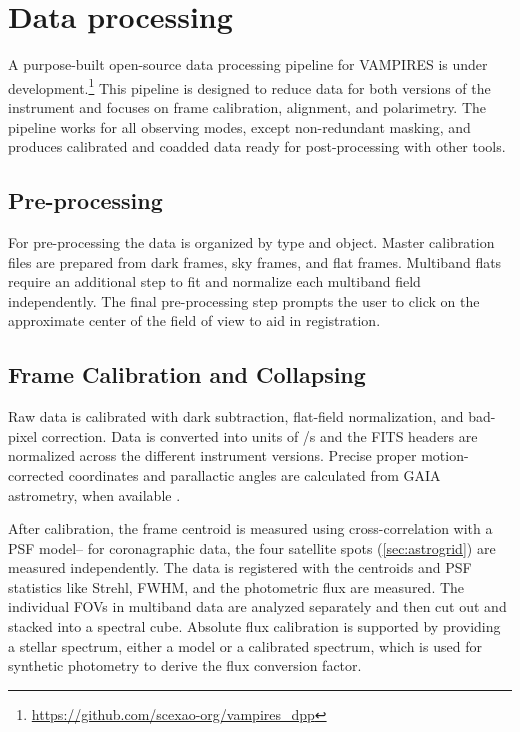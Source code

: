 \section{Data processing}\label{sec:processing}

A purpose-built open-source data processing pipeline for VAMPIRES is under development.\footnote{\url{https://github.com/scexao-org/vampires_dpp}} This pipeline is designed to reduce data for both versions of the instrument and focuses on frame calibration, alignment, and polarimetry. The pipeline works for all observing modes, except non-redundant masking, and produces calibrated and coadded data ready for post-processing with other tools.

\subsection{Pre-processing}
For pre-processing the data is organized by type and object. Master calibration files are prepared from dark frames, sky frames, and flat frames. Multiband flats require an additional step to fit and normalize each multiband field independently. The final pre-processing step prompts the user to click on the approximate center of the field of view to aid in registration.

\subsection{Frame Calibration and Collapsing}

Raw data is calibrated with dark subtraction, flat-field normalization, and bad-pixel correction. Data is converted into units of \si{\electron/\second} and the FITS headers are normalized across the different instrument versions. Precise proper motion-corrected coordinates and parallactic angles are calculated from GAIA astrometry, when available \citep{gaia_collaboration_gaia_2016,gaia_collaboration_gaia_2018,gaia_collaboration_gaia_2021}.

After calibration, the frame centroid is measured using cross-correlation with a PSF model-- for coronagraphic data, the four satellite spots (\autoref{sec:astrogrid}) are measured independently.  The data is registered with the centroids and PSF statistics like Strehl, FWHM, and the photometric flux are measured. The individual FOVs in multiband data are analyzed separately and then cut out and stacked into a spectral cube. Absolute flux calibration is supported by providing a stellar spectrum, either a model or a calibrated spectrum, which is used for synthetic photometry to derive the flux conversion factor.

